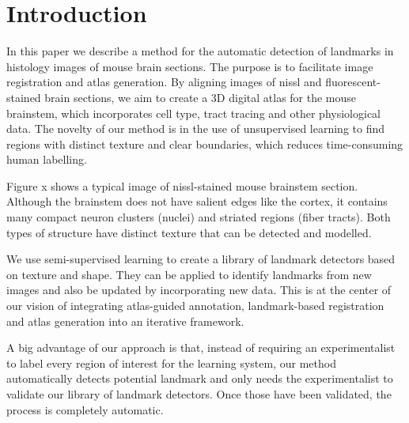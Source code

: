 \documentclass{llncs}
\begin{document}
\section{Introduction}

In this paper we describe a method for the automatic detection of landmarks in histology images of mouse brain sections. The purpose is to facilitate image registration and atlas generation. By aligning images of nissl and fluorescent-stained brain sections, we aim to create a 3D digital atlas for the mouse brainstem, which incorporates cell type, tract tracing and other physiological data. The novelty of our method is in the use of unsupervised learning to find regions with distinct texture and clear boundaries, which reduces time-consuming human labelling.

Figure x shows a typical image of nissl-stained mouse brainstem section. Although the brainstem does not have salient edges like the cortex, it contains many compact neuron clusters (nuclei) and striated regions (fiber tracts). Both types of structure have distinct texture that can be detected and modelled.

We use semi-supervised learning to create a library of landmark detectors based on texture and shape. They can be applied to identify landmarks from new images and also be updated by incorporating new data. This is at the center of our vision of integrating atlas-guided annotation, landmark-based registration and atlas generation into an iterative framework.

A big advantage of our approach is that, instead of requiring an experimentalist to label every region of interest for the learning system, our method automatically detects potential landmark and only needs the experimentalist to validate our library of landmark detectors. Once those have been validated, the process is completely automatic.




\end{document}
